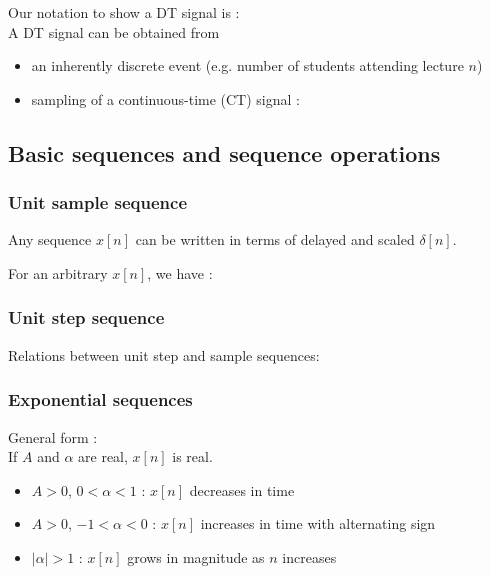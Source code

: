 \documentclass[10pt,a4paper,report]{report}       %
\begin{document}
Our notation to show a DT signal is : \\

A DT signal can be obtained from
\begin{itemize}
  \item an inherently discrete event (e.g. number of students attending lecture $n$)
  \item sampling of a continuous-time (CT) signal :
\end{itemize}
\vspace{3cm}


\subsection{Basic sequences and sequence operations}

\subsubsection{Unit sample sequence}
\vspace{2cm}

Any sequence $x[n]$ can be written in terms of delayed and scaled $\delta[n]$.\\
\vspace{3cm}

For an arbitrary $x[n]$, we have :\\
\vspace{2cm}

\subsubsection{Unit step sequence}
\vspace{2cm}

Relations between unit step and sample sequences:\\
\vspace{3cm}

\subsubsection{Exponential sequences}
General form :\\

If $A$ and $\alpha$ are real, $x[n]$ is real.
\begin{itemize}
  \item $A>0$, $0<\alpha<1$ : $x[n]$ decreases in time
  \item $A>0$, $-1<\alpha<0$ : $x[n]$ increases in time with alternating sign
  \item $|\alpha|>1$ : $x[n]$ grows in magnitude as $n$ increases 
\end{itemize}
\vspace{3cm}
\end{document}
